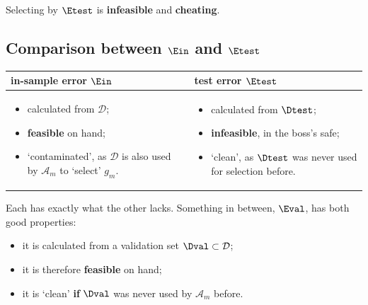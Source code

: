 \begin{moral}
    Selecting by \(\Etest\) is \textbf{infeasible} and \textbf{cheating}.
\end{moral}

\subsection{Comparison between \texorpdfstring{\(\Ein\)}{Ein} and
\texorpdfstring{\(\Etest\)}{Etest}}

\begin{center}
    \solidrules
    \begin{tabular}{p{}|p{}}
        \toprule
        \textbf{in-sample error} \(\Ein\) & \textbf{test error}
        \(\Etest\)\\
        \midrule
        \begin{itemize}[nosep, leftmargin=*, before=\vspace{-0.7\baselineskip}, after=\vspace{-\baselineskip}]
            \item calculated from \(\mathcal{D}\);
            \item \textbf{feasible} on hand;
            \item `contaminated', as \(\mathcal{D}\) is also used by
                \(\mathcal{A}_m\) to `select' \(g_m\).
        \end{itemize}
        &
        \begin{itemize}[nosep, leftmargin=*, before=\vspace{-0.7\baselineskip}, after=\vspace{-\baselineskip}]
            \item calculated from \(\Dtest\);
            \item \textbf{infeasible}, in the boss's safe;
            \item `clean', as \(\Dtest\) was never used for selection before.
        \end{itemize}\\
        \bottomrule
    \end{tabular}
\end{center}

Each has exactly what the other lacks. Something in between, \(\Eval\), has
both good properties:
\begin{itemize}
    \item it is calculated from a validation set \(\Dval \subset
        \mathcal{D}\);
    \item it is therefore \textbf{feasible} on hand;
    \item it is `clean' \textbf{if} \(\Dval\) was never used by
        \(\mathcal{A}_m\) before.
\end{itemize}

